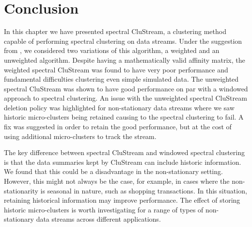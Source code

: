 \section{Conclusion}
\label{sec:clustream_conc}

In this chapter we have presented spectral CluStream, a clustering method capable of performing spectral clustering on data streams. Under the suggestion from \cite{Zhang1996a}, we considered two variations of this algorithm, a weighted and an unweighted algorithm. Despite having a mathematically valid affinity matrix, the weighted spectral CluStream was found to have very poor performance and fundamental difficulties clustering even simple simulated data. The unweighted spectral CluStream was shown to have good performance on par with a windowed approach to spectral clustering. An issue with the unweighted spectral CluStream deletion policy was highlighted for non-stationary data streams where we saw historic micro-clusters being retained causing to the spectral clustering to fail. A fix was suggested in order to retain the good performance, but at the cost of using additional micro-clusters to track the stream.

The key difference between spectral CluStream and windowed spectral clustering is that the data summaries kept by CluStream can include historic information. We found that this could be a disadvantage in the non-stationary setting. However, this might not always be the case, for example, in cases where the non-stationarity is seasonal in nature, such as shopping transactions. In this situation, retaining historical information may improve performance. The effect of storing historic micro-clusters is worth investigating for a range of types of non-stationary data streams across different applications.%





